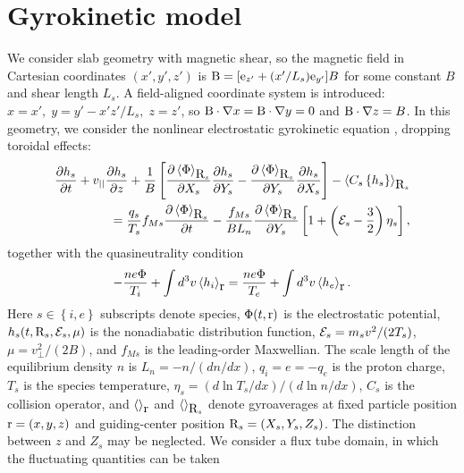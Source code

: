 \documentclass{jpp}
\begin{document}
\section{Gyrokinetic model}
\label{sec:model}

We consider slab geometry with magnetic shear, so the magnetic field in Cartesian
coordinates $(x',y',z')$ is $\boldsymbol{$B$} = [\boldsymbol{$e$}_{z'} + (x' / L_s) \boldsymbol{$e$}_{y'} ]B$
for some constant $B$ and shear length $L_s$.  A field-aligned coordinate system
is introduced: $x = x', \;y = y' - x' z' / L_s, \; z = z'$,
so $\boldsymbol{$B$}\cdot\nabla x = \boldsymbol{$B$}\cdot\nabla y = 0$ and $\boldsymbol{$B$}\cdot\nabla z = B$.
In this geometry, we consider the nonlinear electrostatic
gyrokinetic equation \citep{FriemanChen},
dropping toroidal effects:
\begin{eqnarray}
\label{eq:gke}
\frac{\partial h_s}{\partial t}
+ v_{||} \frac{\partial h_s}{\partial z}
+ \frac{1}{B} \left[
\frac{\partial \left<\Phi\right>_{\boldsymbol{$R$}_s}}{\partial X_s} \frac{\partial h_s}{\partial Y_s}
-\frac{\partial \left<\Phi\right>_{\boldsymbol{$R$}_s}}{\partial Y_s} \frac{\partial h_s}{\partial X_s}
\right]
-\left< C_s\left\{h_s\right\} \right>_{\boldsymbol{$R$}_s} \\
=
\frac{q_s}{T_s} f_{Ms} \frac{\partial \left<\Phi\right>_{\boldsymbol{$R$}_s}}{\partial t}
-\frac{f_{Ms}}{B L_n} \frac{\partial \left< \Phi\right>_{\boldsymbol{$R$}_s}}{\partial Y_s}
\left[ 1 + \left( \mathcal{E}_s-\frac{3}{2}\right) \eta_s\right],
\nonumber
\end{eqnarray}
together with the quasineutrality condition
\begin{equation}
-\frac{n e \Phi}{T_i} + \int d^3v \left<h_i\right>_{\boldsymbol{$r$}}
=
\frac{n e \Phi}{T_e} + \int d^3v \left<h_e\right>_{\boldsymbol{$r$}}.
\label{eq:qn}
\end{equation}
Here $s \in \left\{i,e\right\}$ subscripts denote species,
$\Phi(t,\boldsymbol{$r$})$ is the electrostatic potential, $h_s(t,\boldsymbol{$R$}_s,\mathcal{E}_s,\mu)$ is the nonadiabatic distribution function,
$\mathcal{E}_s = m_s v^2/(2 T_s)$, $\mu = v_{\bot}^2/(2B)$,
and $f_{Ms}$ is the leading-order Maxwellian.
The scale length of the equilibrium density $n$ is $L_n = -n/(dn/dx)$,
$q_i = e = -q_e$ is the proton charge,
$T_s$ is the species temperature,
$\eta_s=(d \ln T_s/dx)/(d \ln n/dx)$,
$C_s$ is the collision operator,
and
$\left<\right>_{\boldsymbol{$r$}}$
and
$\left<\right>_{\boldsymbol{$R$}_s}$
denote gyroaverages at fixed particle position $\boldsymbol{$r$}=(x,y,z)$ and guiding-center position $\boldsymbol{$R$}_s=(X_s,Y_s,Z_s)$.
The distinction between $z$ and $Z_s$ may be neglected.
We consider a flux tube domain, in which the fluctuating quantities can be taken
\end{document}
